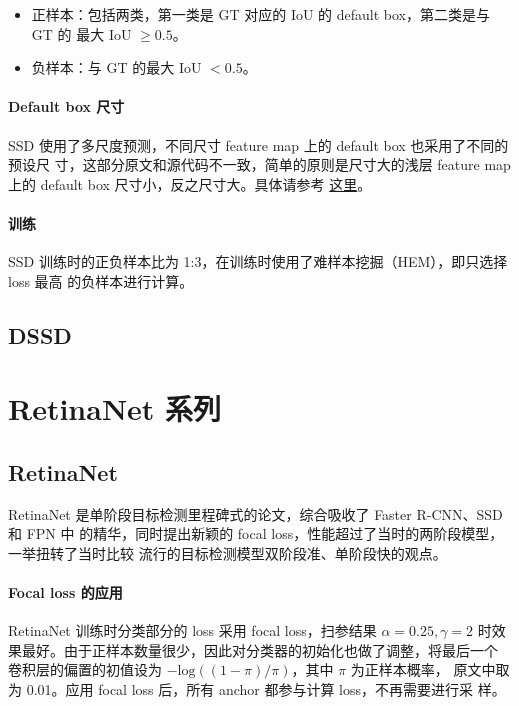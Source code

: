 \begin{itemize}
\item 正样本：包括两类，第一类是 GT 对应的 IoU 的 default box，第二类是与 GT 的
  最大 IoU $ \geq 0.5 $。 
\item 负样本：与 GT 的最大 IoU $ < 0.5 $。
\end{itemize}

\paragraph{Default box 尺寸} 
SSD 使用了多尺度预测，不同尺寸 feature map 上的 default box 也采用了不同的预设尺
寸，这部分原文和源代码不一致，简单的原则是尺寸大的浅层 feature map 上的 default
box 尺寸小，反之尺寸大。具体请参考
\href{https://github.com/weiliu89/caffe/blob/ssd/examples/ssd/ssd_pascal.py}{这里}。

\paragraph{训练} 
SSD 训练时的正负样本比为 1:3，在训练时使用了难样本挖掘（HEM），即只选择 loss 最高
的负样本进行计算。

\subsection{DSSD}
\label{subsec:DSSD}

\section{RetinaNet 系列}

\subsection{RetinaNet}
\label{sub:RetinaNet}

RetinaNet 是单阶段目标检测里程碑式的论文，综合吸收了 Faster R-CNN、SSD 和 FPN 中
的精华，同时提出新颖的 focal loss，性能超过了当时的两阶段模型，一举扭转了当时比较
流行的目标检测模型双阶段准、单阶段快的观点。

\paragraph{Focal loss 的应用}
RetinaNet 训练时分类部分的 loss 采用 focal loss，扫参结果 $\alpha = 0.25, \gamma
= 2$ 时效果最好。由于正样本数量很少，因此对分类器的初始化也做了调整，将最后一个
卷积层的偏置的初值设为 $-\mathrm{log}((1 - \pi)/ \pi)$，其中 $\pi$ 为正样本概率，
原文中取为 0.01。应用 focal loss 后，所有 anchor 都参与计算 loss，不再需要进行采
样。

